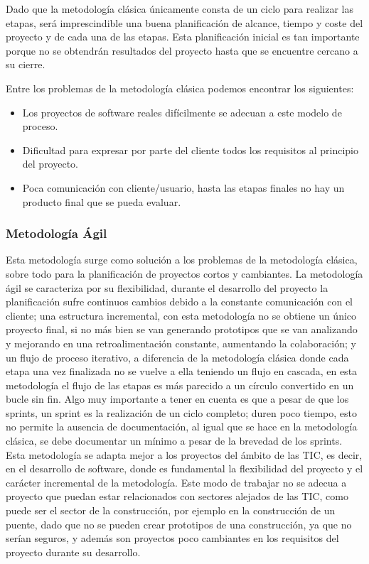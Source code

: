 Dado que la metodología clásica únicamente consta de un ciclo para realizar las etapas, será imprescindible una buena planificación de alcance, tiempo y coste del proyecto y de cada una de las etapas. Esta planificación inicial es tan importante porque no se obtendrán resultados del proyecto hasta que se encuentre cercano a su cierre.

Entre los problemas de la metodología clásica podemos encontrar los siguientes:

\begin{itemize}
\item Los proyectos de software reales difícilmente se adecuan a este modelo de proceso.
\item Dificultad para expresar por parte del cliente todos los requisitos al principio del proyecto.
\item Poca comunicación con cliente/usuario, hasta las etapas finales no hay un producto final que se pueda evaluar.
\end{itemize}

\subsubsection{Metodología Ágil}

Esta metodología surge como solución a los problemas de la metodología clásica, sobre todo para la planificación de proyectos cortos y cambiantes. La metodología ágil se caracteriza por su flexibilidad, durante el desarrollo del proyecto la planificación sufre continuos cambios debido a la constante comunicación con el cliente; una estructura incremental, con esta metodología no se obtiene un único proyecto final, si no más bien se van generando prototipos que se van analizando y mejorando en una retroalimentación constante, aumentando la colaboración; y un flujo de proceso iterativo, a diferencia de la metodología clásica donde cada etapa una vez finalizada no se vuelve a ella teniendo un flujo en cascada, en esta metodología el flujo de las etapas es más parecido a un círculo convertido en un bucle sin fin. Algo muy importante a tener en cuenta es que a pesar de que los sprints, un sprint es la realización de un ciclo completo; duren poco tiempo, esto no permite la ausencia de documentación, al igual que se hace en la metodología clásica, se debe documentar un mínimo a pesar de la brevedad de los sprints. Esta metodología se adapta mejor a los proyectos del ámbito de las TIC, es decir, en el desarrollo de software, donde es fundamental la flexibilidad del proyecto y el carácter incremental de la metodología. Este modo de trabajar no se adecua a proyecto que puedan estar relacionados con sectores alejados de las TIC, como puede ser el sector de la construcción, por ejemplo en la construcción de un puente, dado que no se pueden crear prototipos de una construcción, ya que no serían seguros, y además son proyectos poco cambiantes en los requisitos del proyecto durante su desarrollo.

